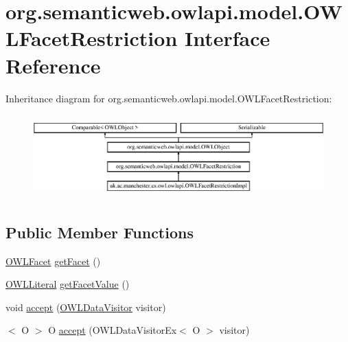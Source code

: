 \hypertarget{interfaceorg_1_1semanticweb_1_1owlapi_1_1model_1_1_o_w_l_facet_restriction}{\section{org.\-semanticweb.\-owlapi.\-model.\-O\-W\-L\-Facet\-Restriction Interface Reference}
\label{interfaceorg_1_1semanticweb_1_1owlapi_1_1model_1_1_o_w_l_facet_restriction}
}
Inheritance diagram for org.\-semanticweb.\-owlapi.\-model.\-O\-W\-L\-Facet\-Restriction\-:\begin{figure}[H]
\begin{center}
\leavevmode
\includegraphics[height=3.246377cm]{interfaceorg_1_1semanticweb_1_1owlapi_1_1model_1_1_o_w_l_facet_restriction}
\end{center}
\end{figure}
\subsection*{Public Member Functions}
\begin{DoxyCompactItemize}
\item 
\hyperlink{enumorg_1_1semanticweb_1_1owlapi_1_1vocab_1_1_o_w_l_facet}{O\-W\-L\-Facet} \hyperlink{interfaceorg_1_1semanticweb_1_1owlapi_1_1model_1_1_o_w_l_facet_restriction_a92a966a091c7826d47371932fd1aff96}{get\-Facet} ()
\item 
\hyperlink{interfaceorg_1_1semanticweb_1_1owlapi_1_1model_1_1_o_w_l_literal}{O\-W\-L\-Literal} \hyperlink{interfaceorg_1_1semanticweb_1_1owlapi_1_1model_1_1_o_w_l_facet_restriction_ac1eeeb10d66d4d21784a8985ec5908d9}{get\-Facet\-Value} ()
\item 
void \hyperlink{interfaceorg_1_1semanticweb_1_1owlapi_1_1model_1_1_o_w_l_facet_restriction_a3aca6fe1d1a326ddb00830cc109a569e}{accept} (\hyperlink{interfaceorg_1_1semanticweb_1_1owlapi_1_1model_1_1_o_w_l_data_visitor}{O\-W\-L\-Data\-Visitor} visitor)
\item 
$<$ O $>$ O \hyperlink{interfaceorg_1_1semanticweb_1_1owlapi_1_1model_1_1_o_w_l_facet_restriction_afcf38dcd23fbad6b0706d4c1ed48b61d}{accept} (O\-W\-L\-Data\-Visitor\-Ex$<$ O $>$ visitor)
\end{DoxyCompactItemize}


